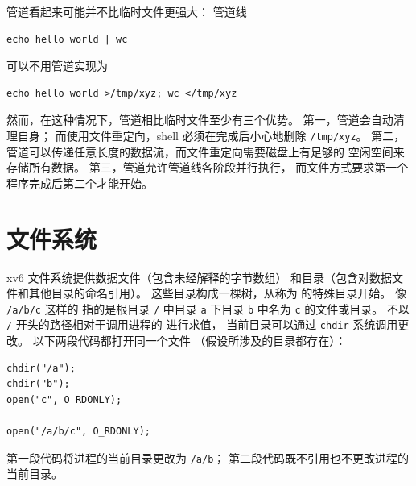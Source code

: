 
管道看起来可能并不比临时文件更强大：
管道线
\begin{lstlisting}[]
echo hello world | wc
\end{lstlisting}
可以不用管道实现为
\begin{lstlisting}[]
echo hello world >/tmp/xyz; wc </tmp/xyz
\end{lstlisting}
然而，在这种情况下，管道相比临时文件至少有三个优势。
第一，管道会自动清理自身；
而使用文件重定向，shell 必须在完成后小心地删除
\lstinline{/tmp/xyz}。
第二，管道可以传递任意长度的数据流，而文件重定向需要磁盘上有足够的
空闲空间来存储所有数据。
第三，管道允许管道线各阶段并行执行，
而文件方式要求第一个程序完成后第二个才能开始。
\section{文件系统}

xv6 文件系统提供数据文件（包含未经解释的字节数组）
和目录（包含对数据文件和其他目录的命名引用）。
这些目录构成一棵树，从称为
的特殊目录开始。
像
\lstinline{/a/b/c}
这样的
指的是根目录
\lstinline{/}
中目录
\lstinline{a}
下目录
\lstinline{b}
中名为
\lstinline{c}
的文件或目录。
不以
\lstinline{/}
开头的路径相对于调用进程的
进行求值，
当前目录可以通过
\lstinline{chdir}
系统调用更改。
以下两段代码都打开同一个文件
（假设所涉及的目录都存在）：
\begin{lstlisting}[]
chdir("/a");
chdir("b");
open("c", O_RDONLY);

open("/a/b/c", O_RDONLY);
\end{lstlisting}
第一段代码将进程的当前目录更改为
\lstinline{/a/b}；
第二段代码既不引用也不更改进程的当前目录。

